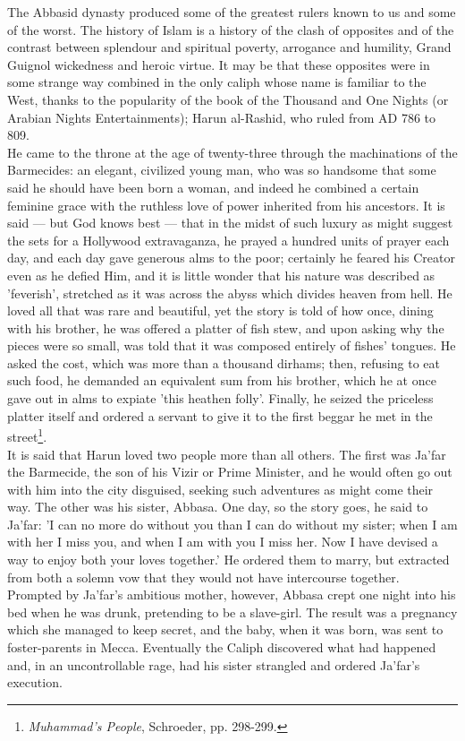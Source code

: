 \documentclass[11pt, b5paper, twoside]{book}
\begin{document}
The Abbasid dynasty produced some of the greatest rulers known to us and some of the worst. The 
history of Islam is a history of the clash of opposites and of the contrast between splendour and 
spiritual poverty, arrogance and humility, Grand Guignol wickedness and heroic virtue. It may be that 
these opposites were in some strange way combined in the only caliph whose name is familiar to the 
West, thanks to the popularity of the book of the Thousand and One Nights (or Arabian Nights 
Entertainments); Harun al-Rashid, who ruled from AD 786 to 809. \\

He came to the throne at the age of twenty-three through the machinations of the Barmecides: an 
elegant, civilized young man, who was so handsome that some said he should have been born a woman, 
and indeed he combined a certain feminine grace with the ruthless love of power inherited from his 
ancestors. It is said --- but God knows best --- that in the midst of such luxury as might suggest the 
sets for a Hollywood extravaganza, he prayed a hundred units of prayer each day, and each day gave 
generous alms to the poor; certainly he feared his Creator even as he defied Him, and it is little 
wonder that his nature was described as 'feverish', stretched as it was across the abyss which 
divides heaven from hell. He loved all that was rare and beautiful, yet the story is told of how 
once, dining with his brother, he was offered a platter of fish stew, and upon asking why the pieces 
were so small, was told that it was composed entirely of fishes' tongues. He asked the cost, which 
was more than a thousand dirhams; then, refusing to eat such food, he demanded an equivalent sum from 
his brother, which he at once gave out in alms to expiate 'this heathen folly'. Finally, he seized 
the priceless platter itself and ordered a servant to give it to the first beggar he met in the 
street\footnote{\emph{Muhammad's People}, Schroeder, pp. 298-299.}. \\

It is said that Harun loved two people more than all others. The first was Ja'far the Barmecide, the 
son of his Vizir or Prime Minister, and he would often go out with him into the city disguised, 
seeking such adventures as might come their way. The other was his sister, Abbasa. One day, so the 
story goes, he said to Ja'far: 'I can no more do without you than I can do without my sister; when I 
am with her I miss you, and when I am with you I miss her. Now I have devised a way to enjoy both 
your loves together.' He ordered them to marry, but extracted from both a solemn vow that they would 
not have intercourse together. Prompted by Ja'far's ambitious mother, however, Abbasa crept one night 
into his bed when he was drunk, pretending to be a slave-girl. The result was a pregnancy which she 
managed to keep secret, and the baby, when it was born, was sent to foster-parents in Mecca. 
Eventually the Caliph discovered what had happened and, in an uncontrollable rage, had his sister 
strangled and ordered Ja'far's execution. \\
\end{document}
